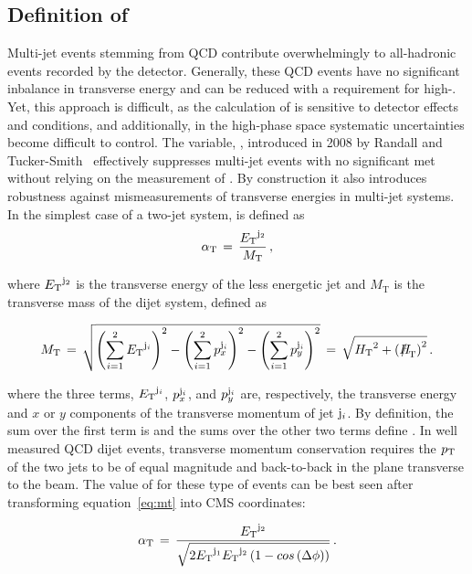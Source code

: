 \clearpage
\subsection{Definition of \texorpdfstring{\alphat}{AlphaT}\label{sec:alphat}}

Multi-jet events stemming from QCD contribute overwhelmingly to
all-hadronic events recorded by the detector. Generally, these QCD events
have no significant inbalance in transverse energy and can 
be reduced with a requirement for high-\met. Yet, this approach is difficult, 
as the calculation of \met is sensitive to detector effects and conditions, 
and additionally, in the high-\met phase space systematic uncertainties become difficult
to control. The variable, \alphat, introduced in 2008 by Randall and 
Tucker-Smith~\cite{Randall:2008rw} effectively suppresses multi-jet 
events with no significant met without relying on the measurement
of \met. By construction it also introduces robustness against mismeasurements 
of transverse energies in multi-jet systems.  In the simplest case of a two-jet system,
\alphat is defined as
\begin{equation}
\label{eq:alphat}
\alpha_{\text{T}}\, =\, \frac{{E_{\text T}}^{{\rm j}_2}}{M_\text{T}} \, ,
\end{equation}

where ${E_{\text T}}^{\rm j_2}$ is the transverse energy of the less energetic
jet and $M_\text{T}$ is the transverse mass of the dijet system,
defined as

\begin{equation}
  \label{eq:mt}
  M_\text{T}\, = \,\sqrt{ \left( \sum_{i=1}^2 \Et^{{\rm j}_i}
    \right)^2 - \left( \sum_{i=1}^2 p_x^{{\rm j}_i} \right)^2 - \left(
      \sum_{i=1}^2 p_y^{{\rm j}_i} \right)^2} \, = \,\sqrt{\scalht^2 + \left(\mht\right)^2} \,  .
\end{equation}

where the three terms, ${E_{\text T}}^{{\rm j}_i}$, $p_x^{{\rm j}_i}$, and $p_y^{{\rm j}_i}$ are,
respectively, the transverse energy and $x$ or $y$ components of the
transverse momentum of jet ${\rm j}_i$. By definition, the sum over the first term is
\scalht and the sums over the other two terms define \mht.  In well 
measured QCD dijet events, transverse momentum conservation requires 
the $p_{\mathrm{T}}$ of the two jets to be of equal magnitude and back-to-back 
in the plane transverse to the beam. The value of \alphat for these 
type of events can be best seen after transforming 
equation~\ref{eq:mt} into CMS coordinates:

\begin{equation}
  \label{eq:mt-polar}
  \alpha_{\text{T}}\, = \,\frac{{E_{\text T}}^{{\rm j}_2}}{\sqrt{2{E_{\text T}}^{{\rm j}_1}
   {E_{\text T}}^{{\rm j}_2} \left(1-cos\left(\Delta\phi\right)\right)}}\, .
\end{equation}

